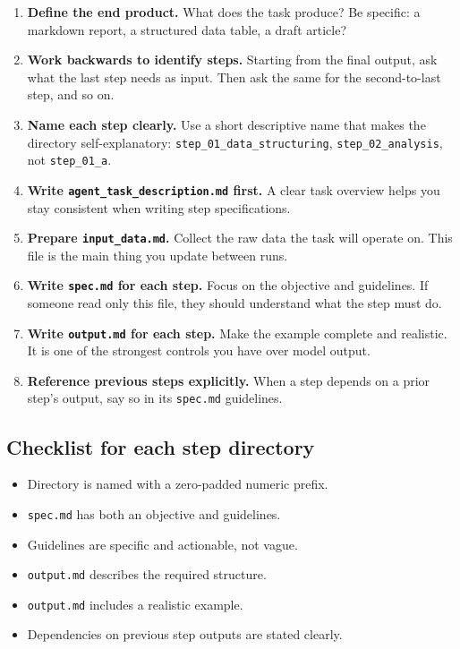 \documentclass[12pt, a4paper]{article}
\begin{document}
\begin{enumerate}[leftmargin=1.5em]
  \item \textbf{Define the end product.} What does the task produce? Be specific: a markdown report, a structured data table, a draft article?
  \item \textbf{Work backwards to identify steps.} Starting from the final output, ask what the last step needs as input. Then ask the same for the second-to-last step, and so on.
  \item \textbf{Name each step clearly.} Use a short descriptive name that makes the directory self-explanatory: \texttt{step\_01\_data\_structuring}, \texttt{step\_02\_analysis}, not \texttt{step\_01\_a}.
  \item \textbf{Write \texttt{agent\_task\_description.md} first.} A clear task overview helps you stay consistent when writing step specifications.
  \item \textbf{Prepare \texttt{input\_data.md}.} Collect the raw data the task will operate on. This file is the main thing you update between runs.
  \item \textbf{Write \texttt{spec.md} for each step.} Focus on the objective and guidelines. If someone read only this file, they should understand what the step must do.
  \item \textbf{Write \texttt{output.md} for each step.} Make the example complete and realistic. It is one of the strongest controls you have over model output.
  \item \textbf{Reference previous steps explicitly.} When a step depends on a prior step's output, say so in its \texttt{spec.md} guidelines.
\end{enumerate}

\subsection{Checklist for each step directory}

\begin{itemize}[leftmargin=1.5em]
  \item Directory is named with a zero-padded numeric prefix.
  \item \texttt{spec.md} has both an objective and guidelines.
  \item Guidelines are specific and actionable, not vague.
  \item \texttt{output.md} describes the required structure.
  \item \texttt{output.md} includes a realistic example.
  \item Dependencies on previous step outputs are stated clearly.
\end{itemize}
\end{document}
